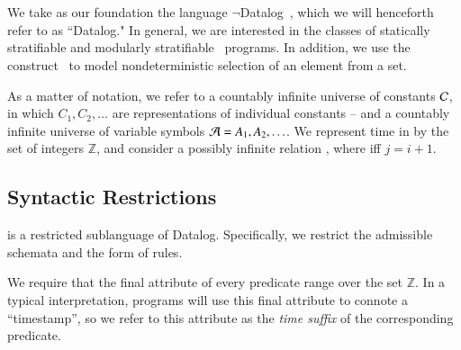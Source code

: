 \section{\large \bf \slang}
We take as our foundation the language $\lnot$Datalog~\cite{ullmanbook}, which
we will henceforth refer to as ``Datalog." In general, we are interested in the
classes of statically stratifiable 
and modularly stratifiable~\cite{modular} programs.  In addition, we use
the  construct~\cite{greedychoice, eventchoice} to model
nondeterministic selection of an element from a set.  

As a matter of notation, we refer to a countably infinite universe of constants
$\Consts$, in which $C_{1}, C_{2}, \ldots$ are representations of individual
constants -- and a countably infinite universe of variable symbols $\Vars = A_1,
A_2, \ldots$.
We represent time in \slang by the set of integers $\mathbb{Z}$, and consider
a possibly infinite relation , where 
iff $j = i + 1$.


\subsection{Syntactic Restrictions}
\label{sec:syntaxrestrictions}

\slang is a restricted sublanguage of Datalog.  Specifically, we restrict the
admissible schemata and the form of rules.

We require that the final attribute of every \slang
predicate range over the set $\mathbb{Z}$.  In a typical
interpretation, \slang programs will use this final attribute to connote a
``timestamp'', so we refer to this attribute as the \emph{time suffix} of the
corresponding predicate.


